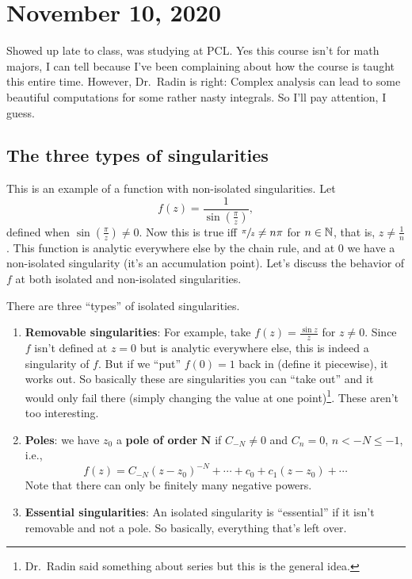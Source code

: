 \section{November 10, 2020}
Showed up late to class, was studying at PCL. Yes this course isn't for math majors, I can tell because I've been complaining about how the course is taught this entire time. However, Dr.\ Radin is right: Complex analysis can lead to some beautiful computations for some rather nasty integrals. So I'll pay attention, I guess.

\subsection{The three types of singularities}
\begin{example}
    This is an example of a function with non-isolated singularities. Let \[
        f(z)=\frac{1}{\sin \left( \frac{\pi}{z} \right) }, 
    \] defined when $\sin\left( \frac{\pi}{z} \right) \neq 0$. Now this is true iff $\sfrac{\pi}{z}\neq n\pi$ for $n\in \mathbb{N}$, that is, $z\neq \frac{1}{n}$. This function is analytic everywhere else by the chain rule, and at $0$ we have a non-isolated singularity (it's an accumulation point). Let's discuss the behavior of $f$ at both isolated and non-isolated singularities. 
\end{example}
\begin{remark}[Important!]\label{singularity}
        There are three ``types'' of isolated singularities.
        \begin{enumerate}
            \item \textbf{Removable singularities}: For example, take $f(z)=\frac{\sin z}{z}$ for $z\neq 0$. Since $f$ isn't defined at $z=0$ but is analytic everywhere else, this is indeed a singularity of $f$. But if we ``put'' $f(0)=1$ back in (define it piecewise), it works out. So basically these are singularities you can ``take out'' and it would only fail there (simply changing the value at one point)\footnote{Dr.\ Radin said something about series but this is the general idea.}. These aren't too interesting.
            \item \textbf{Poles}: we have $z_0$ a \textbf{pole of order} $\mathbf N$ if $C_{-N}\neq 0$ and $C_n =0$, $n<-N\leq -1$, i.e.,  \[
                    f(z)=C_{-N}(z-z_0)^{-N}+\cdots +c_0+c_1(z-z_0)+\cdots 
                \] Note that there can only be finitely many negative powers.
            \item \textbf{Essential singularities}: An isolated singularity is ``essential'' if it isn't removable and not a pole. So basically, everything that's left over.
        \end{enumerate}
    \end{remark}
